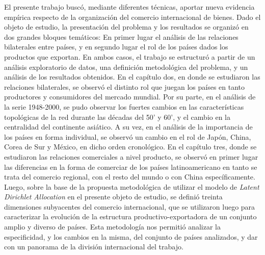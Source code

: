 \documentclass[class=article, crop=false]{standalone}
\begin{document}
El presente trabajo buscó, mediante diferentes técnicas, aportar nueva evidencia empírica respecto de la organización del comercio internacional de bienes. Dado el objeto de estudio, la presentación del problema y los resultados se organizó en dos grandes bloques temáticos: En primer lugar el análisis de las relaciones bilaterales entre países, y en segundo lugar el rol de los países dados los productos que exportan. En ambos casos, el trabajo se estructuró a partir de un análisis exploratorio de datos, una definición metodológica del problema, y un análisis de los resultados obtenidos. 
En el capítulo dos, en donde se estudiaron las relaciones bilaterales, se observó el distinto rol que juegan los países en tanto productores y consumidores del mercado mundial. Por su parte, en el análisis de la serie 1948-2000, se pudo observar los fuertes cambios en las características topológicas de la red durante las décadas del 50' y 60', y el cambio en la centralidad del continente asiático. A su vez, en el análisis de la importancia de los países en forma individual, se observó un cambio en el rol de Japón, China, Corea de Sur y México, en dicho orden cronológico. 
En el capítulo tres, donde se estudiaron las relaciones comerciales a nivel producto, se observó en primer lugar las diferencias en la forma de comerciar de los países latinoamericano en tanto se trata del comercio regional, con el resto del mundo o con China específicamente. Luego, sobre la base de la propuesta metodológica de utilizar el modelo de \textit{Latent Dirichlet Allocation} en el presente objeto de estudio, se definió treinta dimensiones subyacentes del comercio internacional, que se utilizaron luego para caracterizar la evolución de la estructura productivo-exportadora de un conjunto amplio y diverso de países. Esta metodología nos permitió analizar la especificidad, y los cambios en la misma, del conjunto de países analizados, y dar con un panorama de la división internacional del trabajo. 
\end{document}
